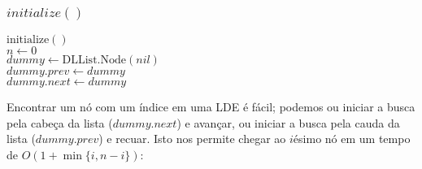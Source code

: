 \documentclass{beamer}
\begin{document}
\begin{frame}
\frametitle{$initialize()$}
\begin{oframed}
\begin{flushleft}
\hspace*{1em} \ensuremath{\mathrm{initialize}()}\\
\hspace*{1em} \hspace*{1em} \ensuremath{\ensuremath{\mathit{n}} \gets  \ensuremath{0}}\\
\hspace*{1em} \hspace*{1em} \ensuremath{\ensuremath{\mathit{dummy}} \gets  \ensuremath{\mathrm{DLList}.\mathrm{\mathrm{Node}}(\ensuremath{\mathit{nil}})}}\\
\hspace*{1em} \hspace*{1em} \ensuremath{\ensuremath{\mathit{dummy}}.\ensuremath{prev} \gets  \ensuremath{dummy}}\\
\hspace*{1em} \hspace*{1em} \ensuremath{\ensuremath{\mathit{dummy}}.\ensuremath{next} \gets  \ensuremath{dummy}}\\
\end{flushleft}
\end{oframed}
\end{frame}

\begin{frame}
Encontrar um nó com um índice em uma LDE é fácil; podemos ou iniciar a busca pela cabeça da lista (\ensuremath{\ensuremath{\ensuremath{\mathit{dummy}}.\ensuremath{\mathit{next}}}}) e avançar,
ou iniciar a busca pela cauda da lista (\ensuremath{\ensuremath{\ensuremath{\mathit{dummy}}.\ensuremath{\mathit{prev}}}}) e recuar.
Isto nos permite chegar ao  \ensuremath{\ensuremath{\ensuremath{\mathit{i}}}}ésimo nó em um tempo de  $O(1+\min\{\ensuremath{\ensuremath{\ensuremath{\mathit{i}}}},\ensuremath{\ensuremath{\ensuremath{\mathit{n}}}}-\ensuremath{\ensuremath{\ensuremath{\mathit{i}}}}\})$:

\end{frame}
\end{document}
